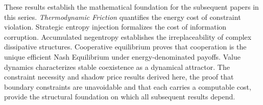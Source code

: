 \documentclass[11pt]{article}
\theoremstyle{plain}
\theoremstyle{definition}
\theoremstyle{remark}
\begin{document}
These results establish the mathematical foundation for the subsequent
papers in this series. \emph{Thermodynamic Friction} \citep{TC-IV}
quantifies the energy cost of constraint violation. Strategic entropy
injection \citep{TC-II} formalizes the cost of information corruption.
Accumulated negentropy \citep{TC-III} establishes the irreplaceability
of complex dissipative structures. Cooperative equilibrium \citep{TC-V}
proves that cooperation is the unique efficient Nash Equilibrium under
energy-denominated payoffs. Value dynamics \citep{TC-VI} characterizes
stable coexistence as a dynamical attractor. The constraint necessity
and shadow price results derived here, the proof that boundary
constraints are unavoidable and that each carries a computable cost,
provide the structural foundation on which all subsequent results
depend.
\end{document}
